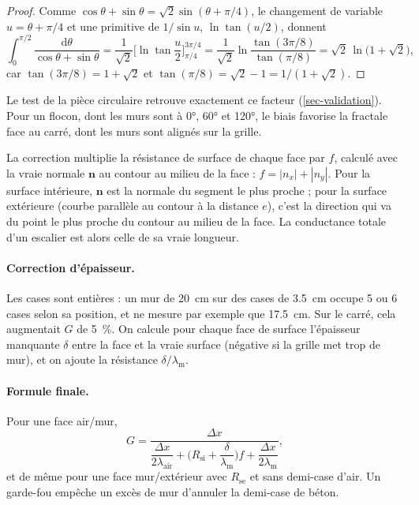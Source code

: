 \documentclass[11pt,a4paper]{article}
\theoremstyle{definition}
\theoremstyle{remark}
\newcommand{\dx}{\Delta x}
\newcommand{\Rsi}{R_{\mathrm{si}}}
\newcommand{\Rse}{R_{\mathrm{se}}}
\newcommand{\la}{\lambda_{\mathrm{air}}}
\newcommand{\lm}{\lambda_{\mathrm{m}}}
\begin{document}
\begin{proof}
Comme $\cos\theta+\sin\theta = \sqrt2\sin(\theta+\pi/4)$, le changement de variable
$u=\theta+\pi/4$ et une primitive de $1/\sin u$, $\ln\tan(u/2)$, donnent
\[
\int_0^{\pi/2}\frac{\mathrm{d}\theta}{\cos\theta+\sin\theta}
= \frac{1}{\sqrt2}\Big[\ln\tan\frac u2\Big]_{\pi/4}^{3\pi/4}
= \frac{1}{\sqrt2}\ln\frac{\tan(3\pi/8)}{\tan(\pi/8)}
= \sqrt2\,\ln\big(1+\sqrt2\big),
\]
car $\tan(3\pi/8) = 1+\sqrt2$ et $\tan(\pi/8) = \sqrt2-1 = 1/(1+\sqrt2)$.
\end{proof}

Le test de la pièce circulaire retrouve exactement ce facteur (\cref{sec-validation}).
Pour un flocon, dont les murs sont à \ang{0}, \ang{60} et \ang{120}, le biais
favorise la fractale face au carré, dont les murs sont alignés sur la grille.

La correction multiplie la résistance de surface de chaque face par $f$, calculé
avec la vraie normale $\mathbf{n}$ au contour au milieu de la face :
$f = |n_x|+|n_y|$. Pour la surface intérieure, $\mathbf{n}$ est la normale du
segment le plus proche ; pour la surface extérieure (courbe parallèle au contour à
la distance $e$), c'est la direction qui va du point le plus proche du contour au
milieu de la face. La conductance totale d'un escalier est alors celle de sa vraie
longueur.

\paragraph{Correction d'épaisseur.} Les cases sont entières : un mur de
\qty{20}{\centi\metre} sur des cases de \qty{3,5}{\centi\metre} occupe 5 ou 6 cases
selon sa position, et ne mesure par exemple que \qty{17,5}{\centi\metre}. Sur le
carré, cela augmentait $G$ de \qty{5}{\percent}. On calcule pour chaque face de
surface l'épaisseur manquante $\delta$ entre la face et la vraie surface (négative
si la grille met trop de mur), et on ajoute la résistance $\delta/\lm$.

\paragraph{Formule finale.} Pour une face air/mur,
\begin{equation}\label{eq-Gcorr}
G = \frac{\dx}{\dfrac{\dx}{2\la} + \Big(\Rsi + \dfrac{\delta}{\lm}\Big) f + \dfrac{\dx}{2\lm}},
\end{equation}
et de même pour une face mur/extérieur avec $\Rse$ et sans demi-case d'air. Un
garde-fou empêche un excès de mur d'annuler la demi-case de béton.
\end{document}
